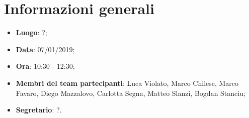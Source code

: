 \section{Informazioni generali}
\begin{itemize}
	\item \textbf{Luogo}: ?; 
	\item \textbf{Data}: 07/01/2019; 
	\item \textbf{Ora}: 10:30 - 12:30; 
	\item \textbf{Membri del team partecipanti}: Luca Violato, Marco Chilese, Marco Favaro, 
	Diego Mazzalovo, Carlotta Segna, Matteo Slanzi, Bogdan Stanciu; 
	\item \textbf{Segretario}: ?. 
\end{itemize}






